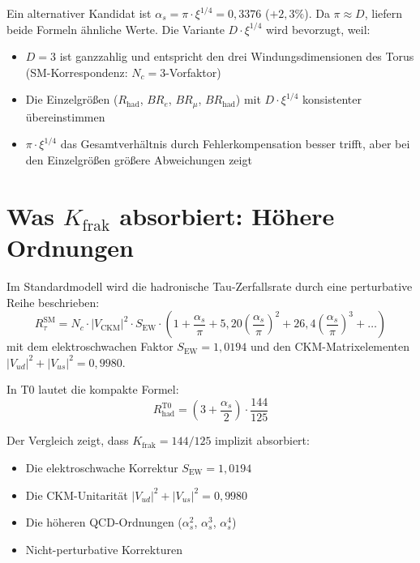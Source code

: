 	Ein alternativer Kandidat ist $\alpha_s = \pi \cdot \xi^{1/4} = 0{,}3376$ ($+2{,}3\%$). Da $\pi \approx D$, liefern beide Formeln ähnliche Werte. Die Variante $D \cdot \xi^{1/4}$ wird bevorzugt, weil:
	\begin{itemize}
		\item $D = 3$ ist ganzzahlig und entspricht den drei Windungsdimensionen des Torus (SM-Korrespondenz: $N_c=3$-Vorfaktor)
		\item Die Einzelgrößen ($R_\text{had}$, $BR_e$, $BR_\mu$, $BR_\text{had}$) mit $D \cdot \xi^{1/4}$ konsistenter übereinstimmen
		\item $\pi \cdot \xi^{1/4}$ das Gesamtverhältnis durch Fehlerkompensation besser trifft, aber bei den Einzelgrößen größere Abweichungen zeigt
	\end{itemize}
	
	
	\section{Was $K_\text{frak}$ absorbiert: Höhere Ordnungen}
	\label{sec:higher}
	
	Im Standardmodell wird die hadronische Tau-Zerfallsrate durch eine perturbative Reihe beschrieben:
	\begin{equation}
		R_\tau^\text{SM} = N_c \cdot |V_\text{CKM}|^2 \cdot S_\text{EW} \cdot \left(1 + \frac{\alpha_s}{\pi} + 5{,}20 \left(\frac{\alpha_s}{\pi}\right)^2 + 26{,}4 \left(\frac{\alpha_s}{\pi}\right)^3 + \ldots\right)
	\end{equation}
	mit dem elektroschwachen Faktor $S_\text{EW} = 1{,}0194$ und den CKM-Matrixelementen $|V_{ud}|^2 + |V_{us}|^2 = 0{,}9980$.
	
	In T0 lautet die kompakte Formel:
	\begin{equation}
		R_\text{had}^\text{T0} = \left(3 + \frac{\alpha_s}{2}\right) \cdot \frac{144}{125}
	\end{equation}
	
	Der Vergleich zeigt, dass $K_\text{frak} = 144/125$ implizit absorbiert:
	\begin{itemize}
		\item Die elektroschwache Korrektur $S_\text{EW} = 1{,}0194$
		\item Die CKM-Unitarität $|V_{ud}|^2 + |V_{us}|^2 = 0{,}9980$
		\item Die höheren QCD-Ordnungen ($\alpha_s^2$, $\alpha_s^3$, $\alpha_s^4$)
		\item Nicht-perturbative Korrekturen
	\end{itemize}
	
